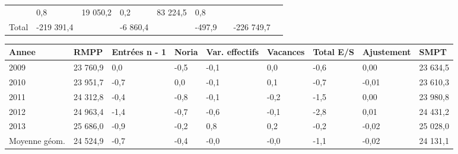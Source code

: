 \begin{longtable}[]{@{}lllllllll@{}}
\begin{minipage}[t]{0.16\columnwidth}
\end{minipage} & \begin{minipage}[t]{0.06\columnwidth}\raggedright
0,8\strut
\end{minipage} & \begin{minipage}[t]{0.12\columnwidth}\raggedright
19 050,2\strut
\end{minipage} & \begin{minipage}[t]{0.06\columnwidth}\raggedright
0,2\strut
\end{minipage} & \begin{minipage}[t]{0.09\columnwidth}\raggedright
83 224,5\strut
\end{minipage} & \begin{minipage}[t]{0.06\columnwidth}\raggedright
0,8\strut
\end{minipage}\tabularnewline
\begin{minipage}[t]{0.05\columnwidth}\raggedright
Total\strut
\end{minipage} & \begin{minipage}[t]{0.10\columnwidth}\raggedright
-219 391,4\strut
\end{minipage} & \begin{minipage}[t]{0.06\columnwidth}\raggedright
\strut
\end{minipage} & \begin{minipage}[t]{0.16\columnwidth}\raggedright
-6 860,4\strut
\end{minipage} & \begin{minipage}[t]{0.06\columnwidth}\raggedright
\strut
\end{minipage} & \begin{minipage}[t]{0.12\columnwidth}\raggedright
-497,9\strut
\end{minipage} & \begin{minipage}[t]{0.06\columnwidth}\raggedright
\strut
\end{minipage} & \begin{minipage}[t]{0.09\columnwidth}\raggedright
-226 749,7\strut
\end{minipage} & \begin{minipage}[t]{0.06\columnwidth}\raggedright
\strut
\end{minipage}\tabularnewline
\bottomrule
\end{longtable}

\begin{longtable}[]{@{}lllllllll@{}}
\toprule
Annee & RMPP & Entrées n - 1 & Noria & Var. effectifs & Vacances & Total
E/S & Ajustement & SMPT\tabularnewline
\midrule
\endhead
2009 & 23 760,9 & 0,0 & -0,5 & -0,1 & 0,0 & -0,6 & 0,00 & 23
634,5\tabularnewline
2010 & 23 951,7 & -0,7 & 0,0 & -0,1 & 0,1 & -0,7 & -0,01 & 23
610,3\tabularnewline
2011 & 24 312,8 & -0,4 & -0,8 & -0,1 & -0,2 & -1,5 & 0,00 & 23
980,8\tabularnewline
2012 & 24 963,4 & -1,4 & -0,7 & -0,6 & -0,1 & -2,8 & 0,01 & 24
431,2\tabularnewline
2013 & 25 686,0 & -0,9 & -0,2 & 0,8 & 0,2 & -0,2 & -0,02 & 25
028,0\tabularnewline
Moyenne géom. & 24 524,9 & -0,7 & -0,4 & -0,0 & -0,0 & -1,1 & -0,02 & 24
131,1\tabularnewline
\bottomrule
\end{longtable}

